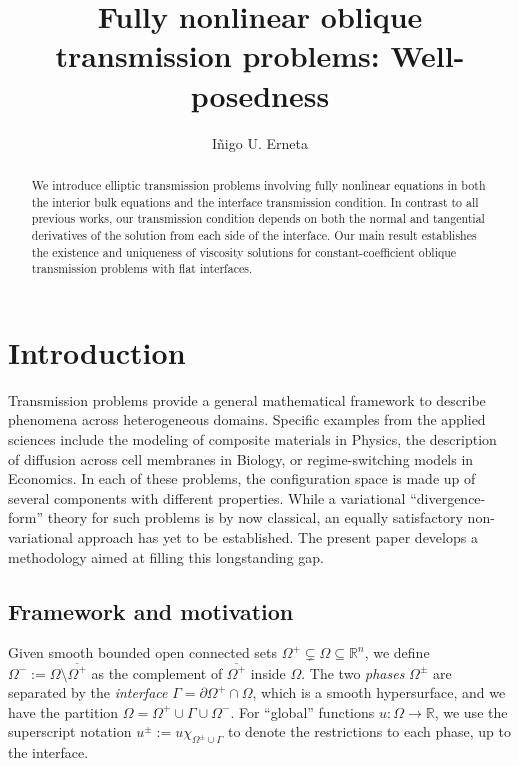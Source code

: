 \documentclass[letter,11pt]{amsart}
\author[I. U. Erneta]{I\~{n}igo U. Erneta}
\title{Fully nonlinear oblique transmission problems: Well-posedness}
\newcommand{\R}{\mathbb{R}}
\newcommand{\chara}[1]{\chi_{#1}}
\theoremstyle{definition}
\numberwithin{equation}{section}
\begin{document}
\begin{abstract}
We introduce elliptic transmission problems involving fully nonlinear equations in both the interior bulk equations and the interface transmission condition.
In contrast to all previous works, our transmission condition depends on both the normal and tangential derivatives of the solution from each side of the interface.
Our main result establishes the existence and uniqueness of viscosity solutions for constant-coefficient oblique transmission problems with flat interfaces.
\end{abstract}

\maketitle

\tableofcontents

\section{Introduction}

Transmission problems provide a general mathematical framework to describe phenomena across heterogeneous domains.
Specific examples from the applied sciences include 
the modeling of composite materials in Physics, the description of diffusion across cell membranes in Biology, or regime-switching models in Economics.
In each of these problems, the configuration space is made up of several components with different properties.
While a variational ``divergence-form'' theory for such problems is by now classical, an equally satisfactory non-variational approach has yet to be established.
The present paper develops a methodology  aimed at filling this longstanding gap.


\subsection{Framework and motivation}
Given smooth bounded open connected sets $\Omega^{+} \subsetneq \Omega \subseteq \R^n$, we define $\Omega^{-} := \Omega \setminus \overline{\Omega^{+}}$ as the complement of $\overline{\Omega^{+}}$ inside $\Omega$.
The two \emph{phases} $\Omega^{\pm}$ are separated by the \emph{interface} $\Gamma = \partial \Omega^{+} \cap \Omega$, which is a smooth hypersurface, and we have the partition $\Omega = \Omega^{+} \cup \Gamma \cup \Omega^{-}$.
For ``global'' functions $u \colon \Omega \to \R$, we use the superscript notation
$u^{\pm} := u \chara{\Omega^{\pm} \cup \Gamma}$
to denote the restrictions to each phase, up to the interface.
\end{document}
